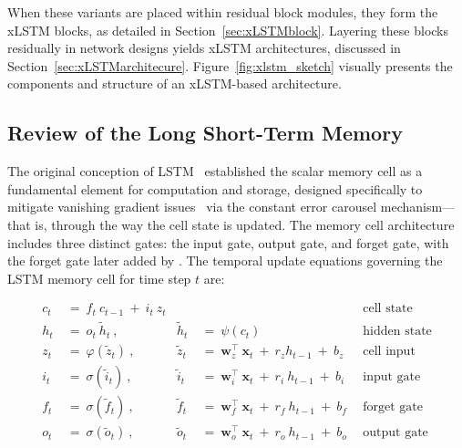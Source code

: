 When these variants are placed within residual block modules, they form the xLSTM blocks, as detailed in Section~\ref{sec:xLSTMblock}. Layering these blocks residually in network designs yields xLSTM architectures, discussed in Section~\ref{sec:xLSTMarchitecure}. Figure~\ref{fig:xlstm_sketch} visually presents the components and structure of an xLSTM-based architecture.

\subsection{Review of the Long Short-Term Memory}
\label{sec:orgLSTM}

The original conception of LSTM~\citep{Hochreiter:91,Hochreiter:97nips,Hochreiter:97} established the scalar memory cell as a fundamental element for computation and storage, designed specifically to mitigate vanishing gradient issues~\citep{Hochreiter:91,Hochreiter:00book} via the constant error carousel mechanism—that is, through the way the cell state is updated. The memory cell architecture includes three distinct gates: the input gate, output gate, and forget gate, with the forget gate later added by \citet{Gers:00}. The temporal update equations governing the LSTM memory cell for time step $t$ are:

\begin{align}
c_t \ &= \  f_t \ c_{t-1} \ + \ i_t \ z_t &  & &\text{cell state} \\
h_t  \ &= \ o_t \ \tilde{h}_t \ , & \tilde{h}_t \ &= \ \psi \left( c_t\right)
  &\text{hidden state} \\
z_t \ &= \ \varphi \left( \tilde{z}_t \right) \ , 
  &\tilde{z}_t \ &=  \ \mathbf{w}^\top_{z} \ \mathbf{x}_t \ + \
  r_{z}  h_{t-1} \ + \  b_{z} \ \
  &\text{cell input} \\
i_t \ &= \ \sigma \left( \tilde{i}_t  \right) \ , 
  &\tilde{i}_t \ &= \ \mathbf{w}^\top_{i} \ \mathbf{x}_t \ + \
  r_{i}  \ h_{t-1} \ + \  b_{i} \ \
  &\text{input gate} \\
f_t \ &= \ \sigma \left(  \tilde{f}_t \right) \ , 
  &\tilde{f}_t \ &= \ \mathbf{w}^\top_{f} \ \mathbf{x}_t  \ + \
  r_{f}  \ h_{t-1} \ + \  b_{f} \ \
  &\text{forget gate} \\
o_t \ &= \ \sigma \left( \tilde{o}_t \right) \ , 
  &\tilde{o}_t  \ &= \ \mathbf{w}^\top_{o} \ \mathbf{x}_t \ + \
  r_{o}  \ h_{t-1} \ + \  b_{o} \ \
  &\text{output gate} 
\end{align}

